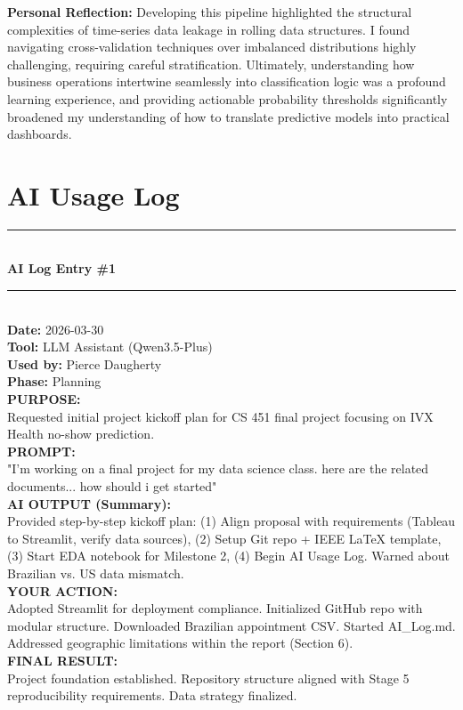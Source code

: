 \documentclass[conference]{IEEEtran}
\begin{document}
\textbf{Personal Reflection:} Developing this pipeline highlighted the structural complexities of time-series data leakage in rolling data structures. I found navigating cross-validation techniques over imbalanced distributions highly challenging, requiring careful stratification. Ultimately, understanding how business operations intertwine seamlessly into classification logic was a profound learning experience, and providing actionable probability thresholds significantly broadened my understanding of how to translate predictive models into practical dashboards. 




\clearpage

\appendices
\section{AI Usage Log}

\noindent\rule{\columnwidth}{0.4pt} \\
\textbf{AI Log Entry \#1} \\
\noindent\rule{\columnwidth}{0.4pt} \\
\textbf{Date:} 2026-03-30 \\
\textbf{Tool:} LLM Assistant (Qwen3.5-Plus) \\
\textbf{Used by:} Pierce Daugherty \\
\textbf{Phase:} Planning \\
\textbf{PURPOSE:} \\
Requested initial project kickoff plan for CS 451 final project focusing on IVX Health no-show prediction. \\
\textbf{PROMPT:} \\
"I'm working on a final project for my data science class. here are the related documents... how should i get started" \\
\textbf{AI OUTPUT (Summary):} \\
Provided step-by-step kickoff plan: (1) Align proposal with requirements (Tableau to Streamlit, verify data sources), (2) Setup Git repo + IEEE LaTeX template, (3) Start EDA notebook for Milestone 2, (4) Begin AI Usage Log. Warned about Brazilian vs. US data mismatch. \\
\textbf{YOUR ACTION:} \\
Adopted Streamlit for deployment compliance. Initialized GitHub repo with modular structure. Downloaded Brazilian appointment CSV. Started AI\_Log.md. Addressed geographic limitations within the report (Section 6). \\
\textbf{FINAL RESULT:} \\
Project foundation established. Repository structure aligned with Stage 5 reproducibility requirements. Data strategy finalized.
\end{document}
